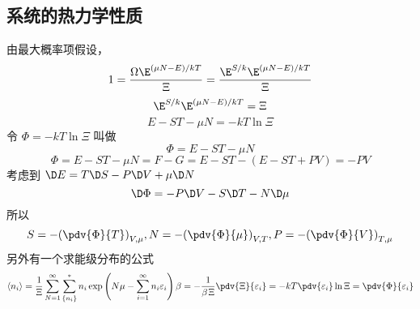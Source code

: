 \subsection{系统的热力学性质}
由最大概率项假设，
\begin{equation}
1 = \frac{{\Omega {\E^{{{\left( {\mu N - E} \right)} \mathord{\left/
 {\vphantom {{\left( {\mu N - E} \right)} {kT}}} \right.
 \kern-\nulldelimiterspace} {kT}}}}}}{\Xi } = \frac{{{\E^{S/k}}{\E^{{{\left( {\mu N - E} \right)} \mathord{\left/
 {\vphantom {{\left( {\mu N - E} \right)} {kT}}} \right.
 \kern-\nulldelimiterspace} {kT}}}}}}{\Xi }
\end{equation}
\begin{equation} 
 {\E^{S/k}}{\E^{{{\left( {\mu N - E} \right)} \mathord{\left/
 {\vphantom {{\left( {\mu N - E} \right)} {kT}}} \right.
 \kern-\nulldelimiterspace} {kT}}}} = \Xi 
\end{equation}
\begin{equation} 
 E - ST - \mu N =  - kT\ln \Xi
\end{equation}
令 $\Phi  =  - kT\ln \Xi $ 叫做
\begin{equation}
 \Phi  = E - ST - \mu N
\end{equation}
\begin{equation}
\Phi  = E - ST - \mu N = F - G = E - ST - (E - ST + PV) =  - PV
\end{equation}
考虑到 $ \D E = T\D S - P\D V + \mu \D N$
\begin{equation}
\D \Phi  =  - P\D V - S\D T - N\D \mu
\end{equation}
所以
\begin{equation}
S =  - {\left( {\pdv{\Phi}{T}} \right)_{V,\mu }} , N =  - {\left( {\pdv{\Phi}{\mu}} \right)_{V,T}} , P =  - {\left( {\pdv{\Phi}{V}} \right)_{T,\mu }}
\end{equation}
另外有一个求能级分布的公式
\begin{equation}
\left\langle {{n_i}} \right\rangle  = \frac{1}{\Xi }\sum\limits_{N = 1}^\infty  {\sum\limits_{\{ {n_i}\} }^ *  {{n_i}\exp \left( {N\mu  - \sum\limits_{i = 1}^\infty  {{n_i}{\varepsilon _i}} } \right)\beta } }  =  - \frac{1}{{\beta {\kern 1pt} \Xi }} \pdv{\Xi}{\varepsilon_i} =  - kT \pdv{\varepsilon _i} \ln \Xi  = \pdv{\Phi}{\varepsilon_i}
\end{equation}